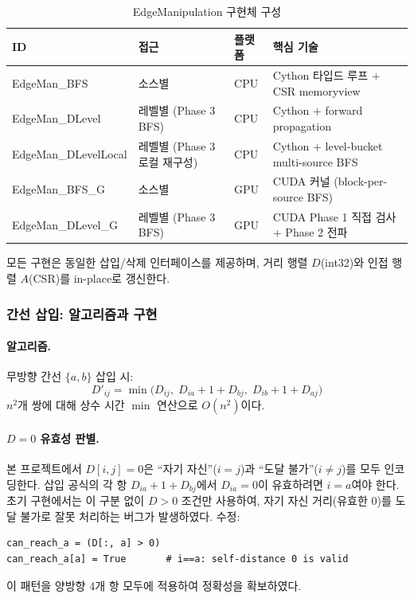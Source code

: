 \documentclass[11pt,a4paper]{article}
\begin{document}
\begin{table}[H]\centering
\caption{EdgeManipulation 구현체 구성}
\small
\begin{tabular}{@{}llll@{}}
\toprule
\textbf{ID} & \textbf{접근} & \textbf{플랫폼} & \textbf{핵심 기술} \\
\midrule
EdgeMan\_BFS & 소스별 & CPU & Cython 타입드 루프 + CSR memoryview \\
EdgeMan\_DLevel & 레벨별 (Phase 3 BFS) & CPU & Cython + forward propagation \\
EdgeMan\_DLevelLocal & 레벨별 (Phase 3 로컬 재구성) & CPU & Cython + level-bucket multi-source BFS \\
EdgeMan\_BFS\_G & 소스별 & GPU & CUDA 커널 (block-per-source BFS) \\
EdgeMan\_DLevel\_G & 레벨별 (Phase 3 BFS) & GPU & CUDA Phase 1 직접 검사 + Phase 2 전파 \\
\bottomrule
\end{tabular}
\end{table}

모든 구현은 동일한 삽입/삭제 인터페이스를 제공하며, 거리 행렬 $D$(int32)와 인접 행렬 $A$(CSR)를 in-place로 갱신한다.

\subsubsection{간선 삽입: 알고리즘과 구현}

\paragraph{알고리즘.}
무방향 간선 $\{a,b\}$ 삽입 시:
\[
D'_{ij} = \min\!\big(D_{ij},\; D_{ia}+1+D_{bj},\; D_{ib}+1+D_{aj}\big)
\]
$n^2$개 쌍에 대해 상수 시간 $\min$ 연산으로 $O(n^2)$이다.

\paragraph{$D=0$ 유효성 판별.}
본 프로젝트에서 $D[i,j]=0$은 ``자기 자신''($i=j$)과 ``도달 불가''($i \neq j$)를 모두 인코딩한다. 삽입 공식의 각 항 $D_{ia}+1+D_{bj}$에서 $D_{ia}=0$이 유효하려면 $i=a$여야 한다. 초기 구현에서는 이 구분 없이 $D>0$ 조건만 사용하여, 자기 자신 거리(유효한 0)를 도달 불가로 잘못 처리하는 버그가 발생하였다. 수정:
\begin{verbatim}
can_reach_a = (D[:, a] > 0)
can_reach_a[a] = True       # i==a: self-distance 0 is valid
\end{verbatim}
이 패턴을 양방향 4개 항 모두에 적용하여 정확성을 확보하였다.
\end{document}
